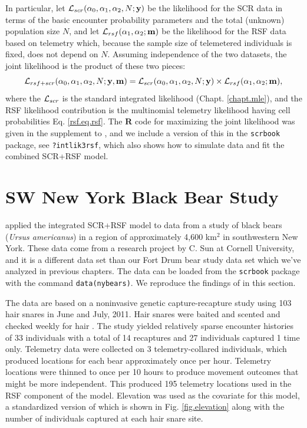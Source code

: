 In particular, let ${\cal L}_{scr}(\alpha_{0}, \alpha_{1}, \alpha_{2}, N;{\bf y})$
be the likelihood for the SCR data in terms of the basic encounter
probability parameters and the total (unknown) population size $N$,
and let ${\cal L}_{rsf}(\alpha_{1},\alpha_{2}; {\bf m})$ be the
likelihood for the RSF data based on telemetry which, because the
sample size of telemetered individuals is fixed, does not depend on $N$.
Assuming independence of the two datasets, the
joint likelihood is the product of these two pieces:
\[
{\cal L}_{rsf+scr}(\alpha_{0},\alpha_{1},\alpha_{2},N; {\bf y},{\bf
  m})  =
{\cal L}_{scr}(\alpha_{0}, \alpha_{1}, \alpha_{2}, N;{\bf y})
\times
{\cal L}_{rsf}(\alpha_{1},\alpha_{2}; {\bf m}),
\]
where the ${\cal L}_{scr}$ is the standard integrated likelihood
(Chapt. \ref{chapt.mle}), and the RSF likelihood contribution is the
multinomial telemetry likelihood having cell probabilities
Eq. \ref{rsf.eq.rsf}.  The {\bf R} code for maximizing the joint likelihood
was given in the
supplement to \citet{royle_etal:2012mee}, and we include a version of
this in the \mbox{\tt scrbook} package, see \mbox{\tt ?intlik3rsf},
which also shows how to simulate data and fit the combined SCR+RSF
model.


\section{SW  New York Black Bear Study}
\label{rsf.chapt.nybears}

\citet{royle_etal:2012mee} applied the integrated SCR+RSF model to
data from a study of black bears ({\it Ursus americanus})
in a region of approximately 4,600
km$^2$ in southwestern New York.  These data come from a research
project by C. Sun \citep{sun:2013} at Cornell University, and it is a
different data set than our Fort Drum bear study data set which we've analyzed
in previous chapters.  The data can be loaded from the \mbox{\tt scrbook}
package with the command \mbox{\tt data(nybears)}.
We reproduce the findings of \citet{royle_etal:2012mee} in this section.

The data are based on a noninvasive genetic capture-recapture study
using 103 hair snares in June and July, 2011.  Hair snares were baited
and scented and checked weekly for hair \citep{sun:2013}.  The study
yielded relatively sparse encounter histories
 of 33 individuals with a total of 14 recaptures and 27
individuals captured 1 time only.
Telemetry data were collected on 3 telemetry-collared individuals, which produced
locations for each bear approximately once per hour.  Telemetry
locations were
thinned to once per 10 hours to produce movement outcomes that might
be more independent. This produced 195 telemetry locations used in the
RSF component of the model.  Elevation was used as the covariate for this
model, a standardized version of which is shown in
Fig. \ref{fig.elevation} along with the number of individuals captured
at each 
hair snare site.  



